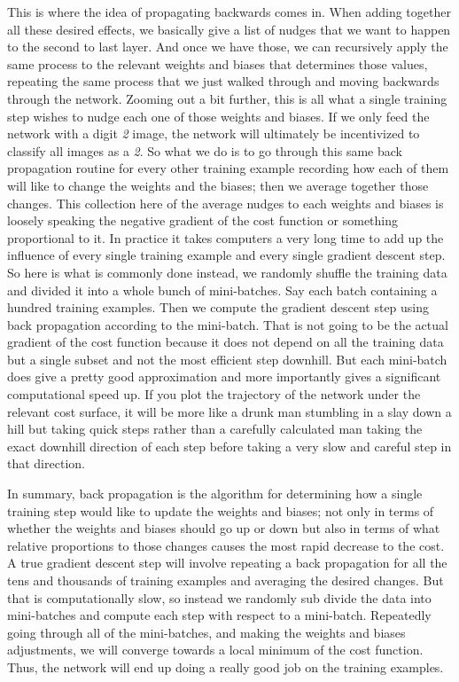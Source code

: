 \documentclass[master]{thesis-uestc}
\begin{document}
This is where the idea of propagating backwards comes in. When adding together all these desired effects, we basically give a list of nudges that we want to happen to the second to last layer. And once we have those, we can recursively apply the same process to the relevant weights and biases that determines those values, repeating the same process that we just walked through and moving backwards through the network. Zooming out a bit further, this is all what a single training step wishes to nudge each one of those weights and biases. If we only feed the network with a digit \textit{2} image, the network will ultimately be incentivized to classify all images as a \textit{2}. So what we do is to go through this same back propagation routine for every other training example recording how each of them will like to change the weights and the biases; then we average together those changes. This collection here of the average nudges to each weights and biases is loosely speaking the negative gradient of the cost function or something proportional to it. In practice it takes computers a very long time to add up the influence of every single training example and every single gradient descent step. So here is what is commonly done instead, we randomly shuffle the training data and divided it into a whole bunch of mini-batches. Say each batch containing a hundred training examples. Then we compute the gradient descent step using back propagation according to the mini-batch. That is not going to be the actual gradient of the cost function because it does not depend on all the training data but a single subset and not the most efficient step downhill. But each mini-batch does give a pretty good approximation and more importantly gives a significant computational speed up. If you plot the trajectory of the network under the relevant cost surface, it will be more like a drunk man stumbling in a slay down a hill but taking quick steps rather than a carefully calculated man taking the exact downhill direction of each step before taking a very slow and careful step in that direction.

In summary, back propagation is the algorithm for determining how a single training step would like to update the weights and biases; not only in terms of whether the weights and biases should go up or down but also in terms of what relative proportions to those changes causes the most rapid decrease to the cost. A true gradient descent step will involve repeating a back propagation for all the tens and thousands of training examples and averaging the desired changes. But that is computationally slow, so instead we randomly sub divide the data into mini-batches and compute each step with respect to a mini-batch. Repeatedly going through all of the mini-batches, and making the weights and biases adjustments, we will converge towards a local minimum of the cost function. Thus, the network will end up doing a really good job on the training examples.
\end{document}
